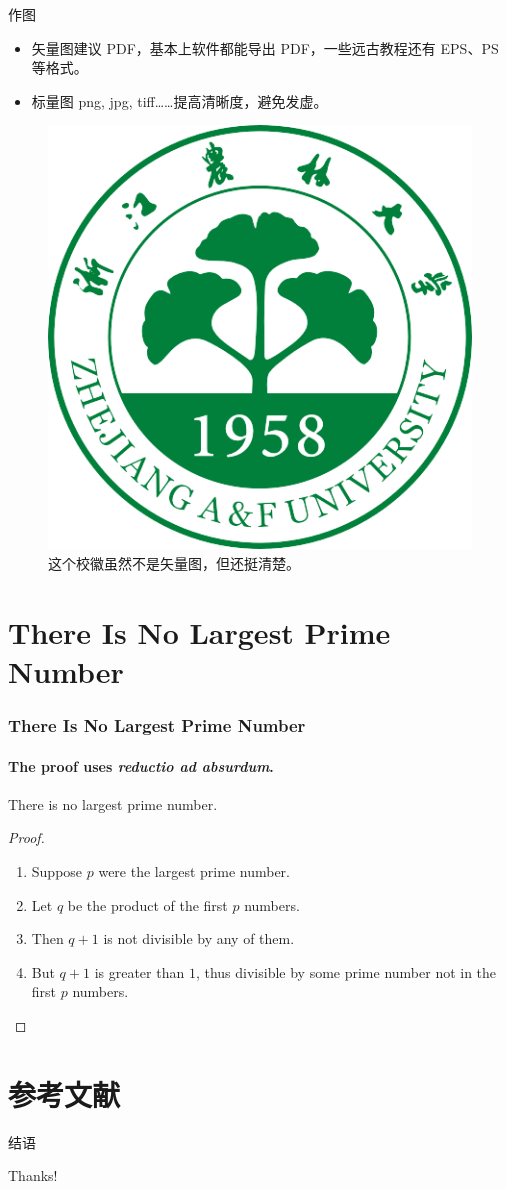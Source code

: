 \documentclass{ctexbeamer}
\begin{document}
\begin{frame}{作图}
	\begin{itemize}
		\item 矢量图建议 PDF，基本上软件都能导出 PDF，一些远古教程还有 EPS、PS 等格式。 
		\item 标量图 png, jpg, tiff……提高清晰度，避免发虚。
	\end{itemize}
	\begin{figure}[htpb]
		\centering
		\includegraphics[width=0.2\linewidth]{pic/zafu-logo.png}
		\caption{这个校徽虽然不是矢量图，但还挺清楚。}
	\end{figure}
\end{frame}

\section{There Is No Largest Prime Number}

\begin{frame}
	\frametitle{There Is No Largest Prime Number}
	\framesubtitle{The proof uses \textit{reductio ad absurdum}.}
	\begin{theorem}\normalfont \rmfamily
	  There is no largest prime number.
	\end{theorem} \pause
	\begin{proof}
	  \begin{enumerate}
		\item<2->Suppose $p$ were the largest prime number.
		\item<3->Let $q$ be the product of the first $p$ numbers.
		\item<4->Then $q + 1$ is not divisible by any of them.
		\item<5->But $q + 1$ is greater than $1$, thus divisible by some prime number not in the first $p$ numbers.\qedhere
	  \end{enumerate}
	\end{proof}
\end{frame}

\section{参考文献}
\begin{frame}[allowframebreaks]
	
	
\end{frame}

\begin{frame}{结语}
	\begin{center}
		{\Huge\calligra Thanks!}
	\end{center}
\end{frame}
\end{document}
